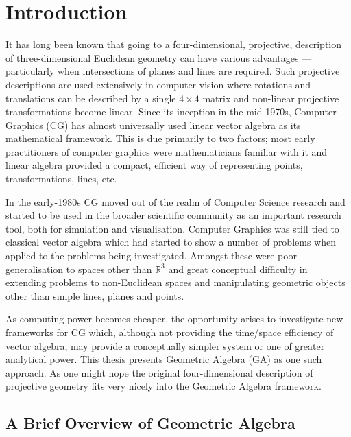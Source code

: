 \begin{savequote}
\end{savequote}

\chapter{Introduction}

It has long been known that going to a four-dimensional, projective, description
of three-dimensional Euclidean geometry can have various advantages --- particularly
when intersections of planes and lines are required. Such
projective descriptions are used extensively in computer vision
where rotations and translations can be described by a single
$4\times 4$ matrix and non-linear projective transformations
become linear. 
Since its inception in the mid-1970s, Computer Graphics (CG) has almost
universally used linear vector algebra as its mathematical framework.
This is due primarily to two factors; most early practitioners of
computer graphics were mathematicians familiar with it and 
linear algebra provided a compact, efficient way of representing points, 
transformations, lines, etc.

In the early-1980s CG moved out of the realm of Computer
Science research and started to be used in the broader scientific 
community as an important research tool, both for simulation and visualisation.
Computer Graphics was still tied to classical vector algebra which
had started to show a number of problems when applied to the problems
being investigated. Amongst these were poor generalisation to
spaces other than $\mathbb{R}^3$ and great conceptual difficulty 
in extending problems to non-Euclidean spaces and
manipulating geometric objects other than simple lines, planes and points.

As computing power becomes cheaper, the opportunity
arises to investigate new
frameworks for CG which, although not providing the time/space
efficiency of vector algebra, may provide a conceptually simpler
system or one of greater analytical power. This thesis presents 
Geometric Algebra (GA) as one such approach.
As one might hope the original four-dimensional description of projective geometry fits
very nicely into the Geometric Algebra framework\cite{HZ91,IJPR00}. 

\section{A Brief Overview of Geometric Algebra}

